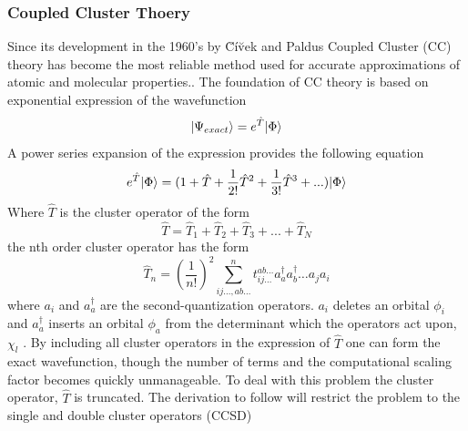     \subsubsection{Coupled Cluster Thoery}
      Since its development in the 1960's by {\u C}{\'i}{\u v}ek and Paldus \cite{Civek 1966, Civek 1969, Civek 1971} Coupled Cluster (CC) theory has become the most reliable method used for accurate approximations of atomic and molecular properties.\cite{Crawford 2000}.  The foundation of CC theory is based on exponential expression of the wavefunction
        \begin{equation}
          | \Psi_{exact} \rangle = e^{\hat{T}}| \Phi \rangle
        \end{equation}
      A power series expansion of the expression provides the following equation
        \begin{equation}
          e^{\hat{T}}| \Phi \rangle = (1 + \hat{T} + \frac{1}{2!} \hat{T}^2 + \frac{1}{3!} \hat{T}^3 + ...) | \Phi \rangle
        \end{equation}
      Where $\hat{T}$ is the cluster operator of the form 
        \begin{equation}
          \hat{T} = \hat{T}_1 + \hat{T}_2 + \hat{T}_3 + ... + \hat{T}_N
        \end{equation}
      the nth order cluster operator has the form 
        \begin{equation}
          \hat{T}_n = \left(\frac{1}{n!}\right)^2 \sum_{ij\dots,ab\dots}^{n} t_{ij\dots}^{ab\dots} a^\dagger_a a^\dagger_b \dots a_j a_i 
        \end{equation}
      where $a_i$ and $a^\dagger_a$ are the second-quantization operators. $a_i$ deletes an orbital $\phi_i$ and $a^\dagger_a$ inserts an orbital $\phi_a$ from the determinant which the operators act upon, $\chi_l$ %
      \cite{Crawford 2000, Bartlett 2007}.
      By including all cluster operators in the expression of $\hat{T}$ one can form the exact wavefunction, though the number of terms and the computational scaling factor becomes quickly unmanageable.  To deal with this problem the cluster operator, $\hat{T}$ is truncated.  The derivation to follow will restrict the problem to the single and double cluster operators (CCSD)

